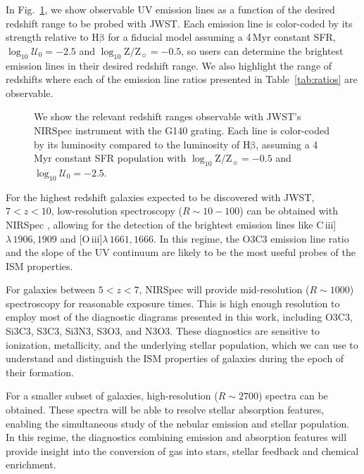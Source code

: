 \documentclass[preprint2]{aastex61}
\newcommand{\oiii}{[O\,{\sc iii}]\xspace}
\newcommand{\ciii}{C\,{\sc iii}]\xspace}
\newcommand{\hb}{\ensuremath{\mathrm{H\beta}}\xspace}
\newcommand{\Myr}{$\,$Myr\xspace}
\newcommand{\logten}{\ensuremath{\log_{10}}}
\newcommand{\logZeq}[1]{\ensuremath{\logten \mathrm{Z}/\mathrm{Z}_{\sun} = #1}}
\newcommand{\logUeq}[1]{\ensuremath{\logten \mathcal{U}_0 = #1}}
\begin{document}
In Fig.~\ref{fig:jwst}, we show observable UV emission lines as a function of the desired redshift range to be probed with JWST. Each emission line is color-coded by its strength relative to \hb for a fiducial model assuming a 4\Myr constant SFR, \logUeq{-2.5} and \logZeq{-0.5}, so users can determine the brightest emission lines in their desired redshift range. We also highlight the range of redshifts where each of the emission line ratios presented in Table~\ref{tab:ratios} are observable.

\begin{figure}
  \begin{center}
    \caption{We show the relevant redshift ranges observable with JWST's NIRSpec instrument with the G140 grating. Each line is color-coded by its luminosity compared to the luminosity of \hb, assuming a 4\Myr constant SFR population with \logZeq{-0.5} and \logUeq{-2.5}.}
    \label{fig:jwst}
  \end{center}
\end{figure}

For the highest redshift galaxies expected to be discovered with JWST, $7 < z < 10$, low-resolution spectroscopy ($R\sim10-100$) can be obtained with NIRSpec \citep{Levesque+2015n}, allowing for the detection of the brightest emission lines like \ciii$\lambda\,1906,1909$ and \oiii$\lambda\,1661,1666$. In this regime, the O3C3 emission line ratio and the slope of the UV continuum are likely to be the most useful probes of the ISM properties.

For galaxies between $5 < z < 7$, NIRSpec will provide mid-resolution ($R\sim1000$) spectroscopy for reasonable exposure times. This is high enough resolution to employ most of the diagnostic diagrams presented in this work, including O3C3, Si3C3, S3C3, Si3N3, S3O3, and N3O3. These diagnostics are sensitive to ionization, metallicity, and the underlying stellar population, which we can use to understand and distinguish the ISM properties of galaxies during the epoch of their formation.

For a smaller subset of galaxies, high-resolution ($R\sim2700$) spectra can be obtained. These spectra will be able to resolve stellar absorption features, enabling the simultaneous study of the nebular emission and stellar population. In this regime, the diagnostics combining emission and absorption features will provide insight into the conversion of gas into stars, stellar feedback and chemical enrichment.
\end{document}
